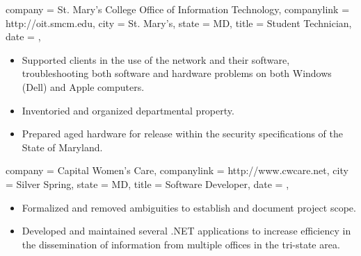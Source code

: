 \documentclass[
textout=\jobname.cv.txt,
textout preamble = preamble.txt,
]{bettercv}
\begin{document}
\begin{position}
  {
    company = St. Mary's College \Dash Office of Information Technology,
    companylink = http://oit.smcm.edu,
    city    = St. Mary's,
    state   = MD,
    title   = Student Technician,
    date    = ,
  }

\begin{itemize}
\item Supported clients in the use of the network and their software,
  troubleshooting both software and hardware problems on both Windows (Dell) and Apple computers.
\item Inventoried and organized departmental property.
\item Prepared aged hardware for release within the security specifications of the State of Maryland.
\end{itemize}
\end{position}

\begin{position}
  {
    company = Capital Women's Care,
    companylink = http://www.cwcare.net,
    city    = Silver Spring,
    state   = MD,
    title   = Software Developer,
    date    = ,
  }

\begin{itemize}
\item Formalized and removed ambiguities to establish and document project scope.
\item Developed and maintained several .NET applications to increase efficiency
  in the dissemination of information from multiple offices in the tri-state area.
\end{itemize}
\end{position}

\appendix
\todos
\end{document}
